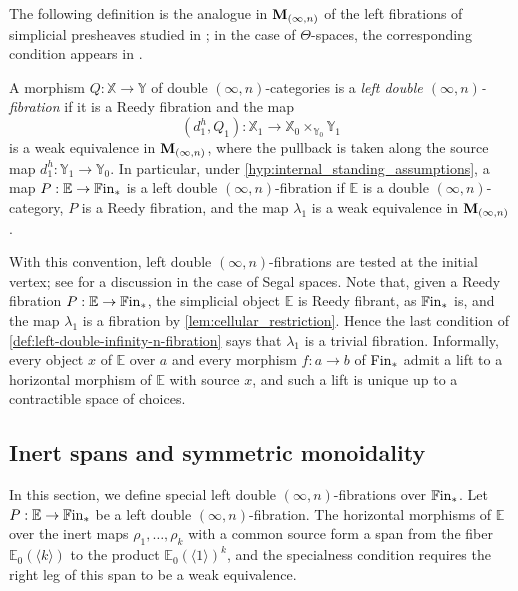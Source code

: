 \documentclass[10pt,reqno]{amsart}
\begin{document}
The following definition is the analogue in $\mathbf M_{(\infty,n)}$ of the left
fibrations of simplicial presheaves studied in
\cite[Definition~2.1 and Lemma~2.6]{Rasekh2021Yoneda}; in the case of
$\Theta$-spaces, the corresponding condition appears in
\cite[\S2.2 and Remark~2.2.5]{MoserRasekhRovelli2024LimitsII}.

\begin{definition}
\label{def:left-double-infinity-n-fibration}
A morphism $Q:\mathbb X\to\mathbb Y$ of double
$(\infty,n)$-categories is a \emph{left double
$(\infty,n)$-fibration} if it is a Reedy fibration and the map
\[
(d_1^h,Q_1):\mathbb X_1\longrightarrow
\mathbb X_0\times_{\mathbb Y_0}\mathbb Y_1
\]
is a weak equivalence in $\mathbf M_{(\infty,n)}$, where the pullback is taken along
the source map $d_1^h:\mathbb Y_1\to\mathbb Y_0$. In particular,
under \cref{hyp:internal_standing_assumptions}, a map
$P:\mathbb E\to\mathbb{F}\mathrm{in}_*$ is a left double $(\infty,n)$-fibration
if $\mathbb E$ is a double $(\infty,n)$-category, $P$ is a Reedy
fibration, and the map $\lambda_1$ is a weak equivalence in
$\mathbf M_{(\infty,n)}$.
\end{definition}

With this convention, left double $(\infty,n)$-fibrations are tested
at the initial vertex; see \cite{Rasekh2023Yoneda} for a discussion in
the case of Segal spaces. Note that, given a Reedy fibration
$P:\mathbb E\to\mathbb{F}\mathrm{in}_*$, the simplicial object $\mathbb E$ is
Reedy fibrant, as $\mathbb{F}\mathrm{in}_*$ is, and the map $\lambda_1$ is a
fibration by \cref{lem:cellular_restriction}. Hence the last condition
of \cref{def:left-double-infinity-n-fibration} says that $\lambda_1$
is a trivial fibration. Informally, every object $x$ of $\mathbb E$
over $a$ and every morphism $f:a\to b$ of $\mathrm{Fin}_*$ admit a lift to
a horizontal morphism of $\mathbb E$ with source $x$, and such a
lift is unique up to a contractible space of choices.

\subsection{Inert spans and symmetric monoidality}
\label{subsec:internal_specialness}

In this section, we define special left double
$(\infty,n)$-fibrations over $\mathbb{F}\mathrm{in}_*$. Let
$P:\mathbb E\to\mathbb{F}\mathrm{in}_*$ be a left double $(\infty,n)$-fibration.
The horizontal morphisms of $\mathbb E$ over the inert maps
$\rho_1,\ldots,\rho_k$ with a common source form a span from the
fiber $\mathbb E_0(\langle k\rangle)$ to the product
$\mathbb E_0(\langle1\rangle)^k$, and the specialness condition
requires the right leg of this span to be a weak equivalence.
\end{document}
